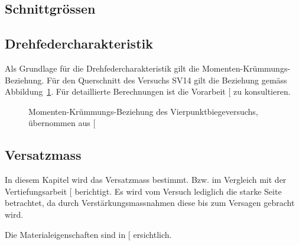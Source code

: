 \documentclass[
  11pt,
  letterpaper,
]{scrreprt}
\begin{document}
\subsection{Schnittgrössen}\label{schnittgruxf6ssen}

\subsection{Drehfedercharakteristik}\label{drehfedercharakteristik-1}

Als Grundlage für die Drehfedercharakteristik gilt die
Momenten-Krümmungs-Beziehung. Für den Querschnitt des Versuchs SV14 gilt
die Beziehung gemäss Abbildung~\ref{fig-mchi_sv14}. Für detaillierte
Berechnungen ist die Vorarbeit {[}\citeproc{ref-gitz_ansatze_2024}{1}{]}
zu konsultieren.

\begin{figure}[H]


\caption{\label{fig-mchi_sv14}Momenten-Krümmungs-Beziehung des
Vierpunktbiegeversuchs, übernommen aus
{[}\citeproc{ref-gitz_ansatze_2024}{1}{]}}

\end{figure}%

\subsection{Versatzmass}\label{versatzmass}

In diesem Kapitel wird das Versatzmass bestimmt. Bzw. im Vergleich mit
der Vertiefungsarbeit {[}\citeproc{ref-gitz_ansatze_2024}{1}{]}
berichtigt. Es wird vom Versuch lediglich die starke Seite betrachtet,
da durch Verstärkungsmassnahmen diese bis zum Versagen gebracht wird.

Die Materialeigenschaften sind in
{[}\citeproc{ref-marienhutte_produktdatenblatt_b550bpdf_nodate}{4}{]}
ersichtlich.
\end{document}

